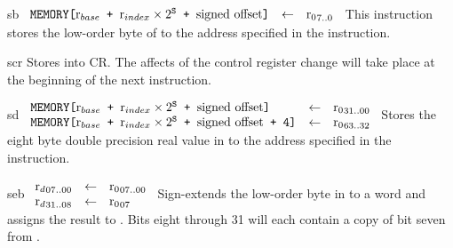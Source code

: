 \begin{instruction}{sb}
     {\sbopc}
     {
       \begin{math}
         \begin{array}{lcl}
           \texttt{MEMORY[\textrm{\ensuremath{\textrm{r}_{base}}} + \(\textrm{\ensuremath{\textrm{r}_{index}}}
               \times 2^\texttt{S}\) +  \textrm{signed offset}]}
           & \leftarrow & {\textrm{r}_{0}}_{7..0}
         \end{array}
       \end{math}
     }
     {
       This instruction stores the low-order byte
       of  to the address specified in the instruction.
     }
\end{instruction}


\begin{instruction}{scr}\label{inst:scr}
    {
      Stores  into \acs{CR}.  The affects of the control
      register change will take place at the beginning of the next
      instruction.
    }
\end{instruction}


\begin{instruction}{sd}
     {\sdopc}
     {
       \begin{math}
         \begin{array}{lcl}
           \texttt{MEMORY[\textrm{\ensuremath{\textrm{r}_{base}}} + \(\textrm{\ensuremath{\textrm{r}_{index}}}
               \times 2^\texttt{S}\) +  \textrm{signed offset}]}
           & \leftarrow & {\textrm{r}_{0}}_{31..00} \\
           \texttt{MEMORY[\textrm{\ensuremath{\textrm{r}_{base}}} + \(\textrm{\ensuremath{\textrm{r}_{index}}}
               \times 2^\texttt{S}\) +  \textrm{signed offset} + 4]}
           & \leftarrow & {\textrm{r}_{0}}_{63..32} \\
         \end{array}
       \end{math}
     }
     {
       Stores the eight byte double precision real value in
        to the address specified in the instruction.
     }
\end{instruction}


\begin{instruction}{seb}
     {\extb}
     {
       \begin{math}
         \begin{array}{lcl}
           {\ensuremath{\textrm{r}_{d}}}_{07..00} & \leftarrow & {\textrm{r}_{0}}_{07..00} \\
           {\textrm{r}_{d}}_{31..08} & \leftarrow & {\textrm{r}_{0}}_{07} \\
         \end{array}
       \end{math}
     }
     {
       Sign-extends the low-order byte in  to a word
       and assigns the result to \dr.  Bits eight through 31
       will each contain a copy of bit seven from .
     }
\end{instruction}


